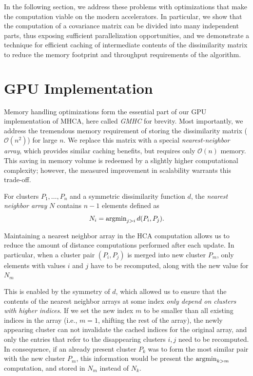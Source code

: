 In the following section, we address these problems with optimizations that make the computation viable on the modern accelerators.
In particular, we show that the computation of a covariance matrix can be divided into many independent parts, thus exposing sufficient parallelization opportunities, and we demonstrate a technique for efficient caching of intermediate contents of the dissimilarity matrix to reduce the memory footprint and throughput requirements of the algorithm.

\section{GPU Implementation}\label{sec:implementation}

Memory handling optimizations form the essential part of our GPU implementation of MHCA, here called \emph{GMHC} for brevity.
Most importantly, we address the tremendous memory requirement of storing the dissimilarity matrix ($\mathcal{O}(n^2)$) for large $n$.
We replace this matrix with a special \emph{nearest-neighbor array}, which provides similar caching benefits, but requires only $\mathcal{O}(n)$ memory.
This saving in memory volume is redeemed by a slightly higher computational complexity; however, the measured improvement in scalability warrants this trade-off.

\begin{defn}
	For clusters $P_1,\dots,P_n$ and a symmetric dissimilarity function $d$, the \emph{nearest neighbor array} $N$ contains $n-1$ elements defined as
	\[N_i = \operatorname{argmin}_{j>i} d(P_i,P_j).\]
	\label{def:nna}
\end{defn}


Maintaining a nearest neighbor array in the HCA computation allows us to reduce the amount of distance computations performed after each update.
In particular, when a cluster pair $(P_i,P_j)$ is merged into new cluster $P_m$, only elements with values $i$ and $j$ have to be recomputed, along with the new value for $N_m$

This is enabled by the symmetry of $d$, which allowed us to ensure that the contents of the nearest neighbor arrays at some index \emph{only depend on clusters with higher indices}.
If we set the new index $m$ to be smaller than all existing indices in the array (i.e., $m=1$, shifting the rest of the array), the newly appearing cluster can not invalidate the cached indices for the original array, and only the entries that refer to the disappearing clusters $i,j$ need to be recomputed.
In consequence, if an already present cluster $P_k$ was to form the most similar pair with the new cluster $P_m$, this information would be present the $\operatorname{argmin}_{k>m}$ computation, and stored in $N_m$ instead of $N_k$.


